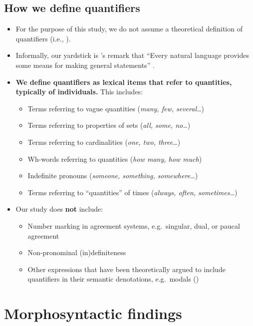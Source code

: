 \documentclass{article}
\begin{document}
\subsection{How we define quantifiers}
\begin{itemize}
\item For the purpose of this study, we do not assume a theoretical definition of quantifiers (i.e., \citealt{heimkratzer98}).
\item Informally, our yardstick is \citeauthor{qnl95}'s remark that ``Every natural language provides some means for making general statements'' \citeyear[1]{qnl95}. %
\item \textbf{We define quantifiers as lexical items that refer to quantities, typically of individuals.}  This includes:
  
  
  \begin{itemize}
  \item Terms referring to vague quantities (\textit{many, few, several\ldots})
  \item Terms referring to properties of sets (\textit{all, some, no\ldots})
  \item Terms referring to cardinalities (\textit{one, two, three\ldots})
  \item Wh-words referring to quantities  (\textit{how many, how much})
  \item Indefinite pronouns (\textit{someone, something, somewhere\ldots})
  \item Terms referring to ``quantities'' of times (\textit{always, often, sometimes\ldots})
  \end{itemize}
\item Our study does \textbf{not} include:
  \begin{itemize}
  \item Number marking in agreement systems, e.g.\ singular, dual, or paucal agreement
  \item Non-pronominal (in)definiteness
  \item Other expressions that have been theoretically argued to include quantifiers in their semantic denotations, e.g.\ modals (\citealt{heimkratzer98})
  \end{itemize}
\end{itemize}

\section{Morphosyntactic findings}
\label{sec:mpsfind}
\end{document}
